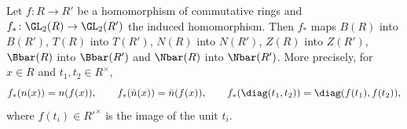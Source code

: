 Let $f\colon R\to R'$ be a homomorphism of commutative rings and $f_*\colon\GL_2(R)\to\GL_2(R')$ the induced
homomorphism. Then $f_*$ maps $B(R)$ into $B(R')$, $T(R)$ into $T(R')$, $N(R)$ into $N(R')$, $Z(R)$ into $Z(R')$,
$\Bbar(R)$ into $\Bbar(R')$ and $\Nbar(R)$ into $\Nbar(R')$. More precisely, for $x\in R$ and $t_1,t_2\in R^\times$,
\[
  f_*(n(x))=n(f(x)),\qquad f_*(\bar n(x))=\bar n(f(x)),\qquad f_*(\diag(t_1,t_2))=\diag(f(t_1),f(t_2)),
\]
where $f(t_i)\in R'^\times$ is the image of the unit $t_i$.
